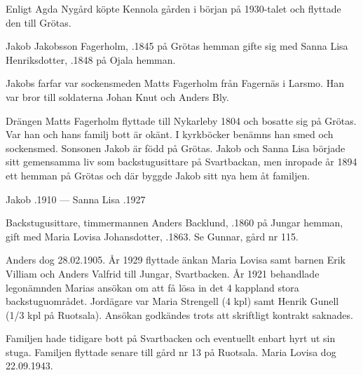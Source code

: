 Enligt Agda Nygård köpte Kennola gården i början på 1930-talet och flyttade den till Grötas.


Jakob Jakobsson Fagerholm, .1845 på Grötas hemman gifte sig med Sanna Lisa Henriksdotter, .1848 på	Ojala hemman.
\begin{jhchildren}
  \item {}
  \item {}
  \item {}
  \item {}
\end{jhchildren}
Jakobs farfar var sockensmeden Matts Fagerholm från Fagernäs i Larsmo. Han var bror till soldaterna Johan Knut och Anders Bly.

Drängen Matts Fagerholm flyttade till Nykarleby 1804 och bosatte sig på Grötas. Var han och hans familj bott är okänt. I kyrkböcker benämns han smed och sockensmed. Sonsonen Jakob är född på Grötas. Jakob och Sanna Lisa började sitt gemensamma liv som backstugusittare på Svartbackan, men inropade år 1894 ett hemman på Grötas och där byggde Jakob sitt nya hem åt familjen.

Jakob .1910  ---  Sanna Lisa .1927






Backstugusittare, timmermannen Anders Backlund, .1860 på Jungar hemman, gift med Maria Lovisa Johansdotter, .1863. Se Gunnar, gård nr 115.

Anders dog 28.02.1905. År 1929 flyttade änkan Maria Lovisa samt barnen Erik Villiam och Anders Valfrid till Jungar, Svartbacken. År 1921 behandlade legonämnden Marias ansökan om att få lösa in det 4 kappland stora backstuguområdet. Jordägare var Maria Strengell (4 kpl) samt Henrik Gunell (1/3 kpl på Ruotsala). Ansökan godkändes trots att skriftligt kontrakt saknades.

Familjen hade tidigare bott på Svartbacken och eventuellt enbart hyrt ut sin stuga. Familjen flyttade senare till gård nr 13 på Ruotsala. Maria Lovisa dog 22.09.1943.


